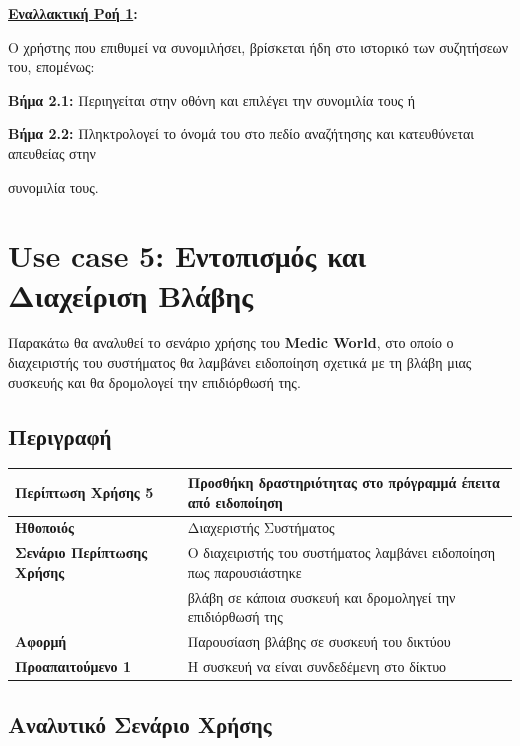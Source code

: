 \documentclass{article}
\newcommand\T{\rule{0pt}{2.6ex}}       %
\newcommand\B{\rule[-1.2ex]{0pt}{0pt}}
\begin{document}
\textbf{\underline{Εναλλακτική Ροή 1}:} \newline
\par Ο χρήστης που επιθυμεί να συνομιλήσει, βρίσκεται ήδη στο ιστορικό των συζητήσεων του, επομένως: \newline
\par \textbf{Βήμα 2.1:} Περιηγείται στην οθόνη και επιλέγει την συνομιλία τους ή \newline
\par \textbf{Βήμα 2.2:} Πληκτρολογεί το όνομά του στο πεδίο αναζήτησης και κατευθύνεται απευθείας στην \par συνομιλία τους.


\section{Use case 5: Εντοπισμός και Διαχείριση Βλάβης}

Παρακάτω θα αναλυθεί το σενάριο χρήσης του \textbf{Medic World}, στο οποίο ο διαχειριστής του συστήματος θα λαμβάνει ειδοποίηση σχετικά με τη βλάβη μιας συσκευής και θα δρομολογεί την επιδιόρθωσή της.

\subsection{Περιγραφή}

\begin{center}
     \begin{tabular}{|l|l|}
     \hline
      \textbf{Περίπτωση Χρήσης 5} & Προσθήκη δραστηριότητας στο πρόγραμμά έπειτα από ειδοποίηση \T\B \\
      \hline
      \textbf{Ηθοποιός} & Διαχεριστής Συστήματος \T\B \\
      \hline
      \textbf{Σενάριο Περίπτωσης Χρήσης} &  Ο διαχειριστής του συστήματος λαμβάνει ειδοποίηση πως παρουσιάστηκε \T \\& βλάβη σε κάποια συσκευή και δρομοληγεί την επιδιόρθωσή της \B \\
      \hline
      \textbf{Αφορμή} & Παρουσίαση βλάβης σε συσκευή του δικτύου \T\B \\
      \hline
      \textbf{Προαπαιτούμενο 1} & Η συσκευή να είναι συνδεδέμενη στο δίκτυο \T\B \\
      \hline
     \end{tabular}
 \end{center}
 
\subsection{Αναλυτικό Σενάριο Χρήσης}
\end{document}
